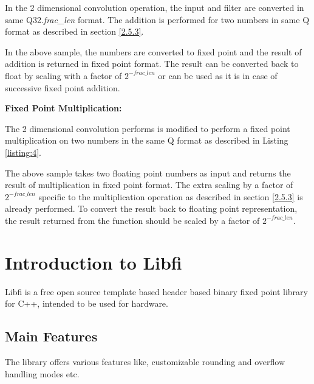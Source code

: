 \vspace{0.25cm}
\noindent In the 2 dimensional convolution operation, the input and filter are converted in same Q32.\textit{frac\_len} format. The addition is performed for two numbers in same Q format as described in section \ref{2.5.3}.


\noindent In the above sample, the numbers are converted to fixed point and the result of addition is returned in fixed point format. The result can be converted back to float by scaling with a factor of $2^{-frac\_len}$ or can be used as it is in case of successive fixed point addition.

\vspace{0.25cm}
\noindent \textbf{Fixed Point Multiplication:}

\vspace{0.25cm}
\noindent The 2 dimensional convolution performs is modified to perform a fixed point multiplication on two numbers in the same Q format as described in Listing \ref{listing:4}.
\noindent 


\noindent The above sample takes two floating point numbers as input and returns the result of multiplication in fixed point format. The extra scaling by a factor of $2^{-frac\_len}$ specific to the multiplication operation as described in section \ref{2.5.3} is already performed. To convert the result back to floating point representation, the result returned from the function should be scaled by a factor of $2^{-frac\_len}$.
\section{Introduction to Libfi}
Libfi is a free open source template based header based binary fixed point library for C++, intended to be used for hardware.
\subsection{Main Features}
The library offers various features like, customizable rounding and overflow handling modes etc.
